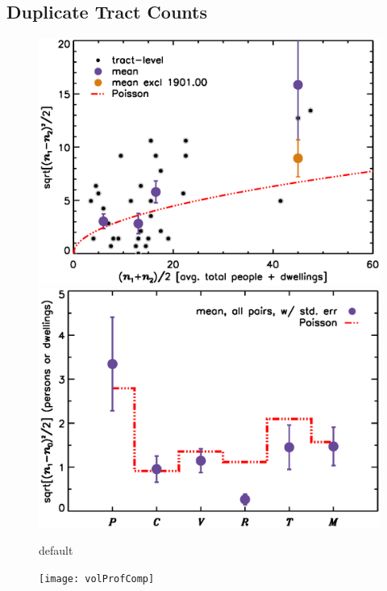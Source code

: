 \documentclass[11pt,twocolumn]{article}
\begin{document}
\subsection{Duplicate Tract Counts}
\label{sec:dupes}

\begin{figure}[]
\centering
	\includegraphics[width=\linewidth]{intDupeChar}\\
	\includegraphics[width=\linewidth]{catDupeChar}
\caption{default}
\label{fig:dupeChar}
\end{figure}

\begin{figure}[]
	\centering
	\texttt{[image: volProfComp]}
	\caption{}
\end{figure}
\end{document}
